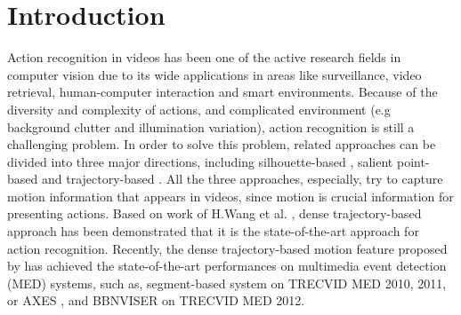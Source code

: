﻿\section{Introduction}

Action recognition in videos has been one of the active research fields in computer vision \cite{pirsiavash2012detecting, poppe2010survey} due to its wide applications in areas like surveillance, video retrieval, human-computer interaction and smart environments.
Because of the diversity and complexity of actions, and complicated environment (e.g background clutter and illumination variation), action recognition is still a challenging problem.
In order to solve this problem, related approaches can be divided into three major directions, including silhouette-based \cite{blank2005actions, ke2007event, vitaladevuni2008action, yilmaz2005actions}, salient point-based \cite{laptev2005space, dollar2005behavior, laptev2008learning, bregonzio2009recognising, klaser2008aspatiotemporal, willems2008efficient} and trajectory-based \cite{matikainen2009trajectons, messing2009activity, sun2009hierarchical}.
All the three approaches, especially, try to capture motion information that appears in videos, since motion is crucial information for presenting actions.
Based on work of H.Wang et al. \cite{wang2011densetraj}, dense trajectory-based approach has been demonstrated that it is the state-of-the-art approach for action recognition.
Recently, the dense trajectory-based motion feature proposed by \cite{wang2011densetraj} has achieved the state-of-the-art performances on multimedia event detection (MED) systems, such as, segment-based system \cite{phan2014multimedia} on TRECVID MED 2010, 2011, or AXES \cite{oneata2012axes}, and BBNVISER \cite{natarajan2012bbn} on TRECVID MED 2012.

